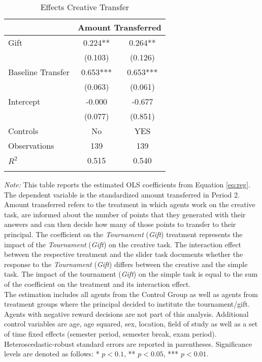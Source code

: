 \begin{table}[H]
\caption{Effects Creative Transfer }%
\begin{center}%
{\small\renewcommand{\arraystretch}{0.8}%
{\setlength{\tabcolsep}{7pt}
\begin{tabular}{lcc}
\hline\hline\noalign{\smallskip}
    & \multicolumn{2}{c}{\textbf{Amount Transferred}}\\
\hline\noalign{\smallskip}
Gift	&	0.224**	&	0.264**  \\
	&	(0.103)	&	(0.126)	\\[4mm]
Baseline Transfer	&	0.653***	&	0.653***	\\
	&	(0.063)	&	(0.061)	\\[4mm]
Intercept	&	-0.000	&	-0.677	\\
	&	(0.077)	&	(0.851)	\\[2mm]
\hline
Controls           &   No   &       YES   \\
\hline
Observations	 &         139   &         139   \\ 
$R^2$               &       0.515   &       0.540 \\
\hline\hline\noalign{\medskip}
\end{tabular}}
\begin{minipage}{0.8\textwidth}
\footnotesize
{\it Note:} This table reports the estimated OLS coefficients from Equation \ref{eq:reg}. The dependent variable is the standardized amount transferred in Period 2. Amount transferred refers to the treatment in which agents work on the creative task, are informed about the number of points that they generated with their answers and can then decide how many of those points to transfer to their principal. The coefficient on the \textit{Tournament} (\textit{Gift}) treatment represents the impact of the \textit{Tournament} (\textit{Gift}) on the creative task. The interaction effect between the respective treatment and the slider task documents whether the response to the \textit{Tournament} (\textit{Gift}) differs between the creative and the simple task. The impact of the tournament (\textit{Gift}) on the simple task is equal to the sum of the coefficient on the treatment and its interaction effect.\\
The estimation includes all agents from the Control Group as well as agents from treatment groups where the principal decided to institute the tournament/gift. Agents with negative reward decisions are not part of this analysis. Additional control variables are age, age squared, sex, location, field of study as well as a set of time fixed  effects (semester period, semester break, exam period). Heteroscedastic-robust standard errors are reported in parentheses. Significance levels are denoted as follows: * $p < 0.1$, ** $p < 0.05$, *** $p < 0.01$. 
\end{minipage}}
\end{center}
\label{tab:Feedback}
\end{table}